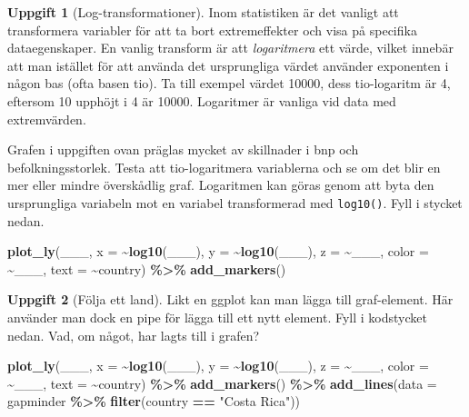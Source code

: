 \documentclass[
]{book}
\newenvironment{Shaded}{\begin{snugshade}}{\end{snugshade}}
\newcommand{\AttributeTok}[1]{\textcolor[rgb]{0.13,0.29,0.53}{#1}}
\newcommand{\FunctionTok}[1]{\textcolor[rgb]{0.13,0.29,0.53}{\textbf{#1}}}
\newcommand{\NormalTok}[1]{#1}
\newcommand{\SpecialCharTok}[1]{\textcolor[rgb]{0.81,0.36,0.00}{\textbf{#1}}}
\newcommand{\StringTok}[1]{\textcolor[rgb]{0.31,0.60,0.02}{#1}}
\theoremstyle{definition}
\theoremstyle{definition}
\theoremstyle{definition}
\newtheorem{exercise}{Uppgift}[chapter]
\theoremstyle{definition}
\theoremstyle{remark}
\begin{document}
\begin{exercise}[Log-transformationer]

Inom statistiken är det vanligt att transformera variabler för att ta bort extremeffekter och visa på specifika dataegenskaper. En vanlig transform är att \emph{logaritmera} ett värde, vilket innebär att man istället för att använda det ursprungliga värdet använder exponenten i någon bas (ofta basen tio). Ta till exempel värdet 10000, dess tio-logaritm är 4, eftersom 10 upphöjt i 4 är 10000. Logaritmer är vanliga vid data med extremvärden.

Grafen i uppgiften ovan präglas mycket av skillnader i bnp och befolkningsstorlek. Testa att tio-logaritmera variablerna och se om det blir en mer eller mindre överskådlig graf. Logaritmen kan göras genom att byta den ursprungliga variabeln mot en variabel transformerad med \texttt{log10()}. Fyll i stycket nedan.

\begin{Shaded}
\begin{Highlighting}[]
\FunctionTok{plot\_ly}\NormalTok{(\_\_\_, }\AttributeTok{x =} \SpecialCharTok{\textasciitilde{}}\FunctionTok{log10}\NormalTok{(\_\_\_), }\AttributeTok{y =} \SpecialCharTok{\textasciitilde{}}\FunctionTok{log10}\NormalTok{(\_\_\_), }\AttributeTok{z =} \SpecialCharTok{\textasciitilde{}}\NormalTok{\_\_\_, }\AttributeTok{color =} \SpecialCharTok{\textasciitilde{}}\NormalTok{\_\_\_, }\AttributeTok{text =} \SpecialCharTok{\textasciitilde{}}\NormalTok{country) }\SpecialCharTok{\%\textgreater{}\%} 
  \FunctionTok{add\_markers}\NormalTok{()}
\end{Highlighting}
\end{Shaded}

\end{exercise}

\begin{exercise}[Följa ett land]

Likt en ggplot kan man lägga till graf-element. Här använder man dock en pipe för lägga till ett nytt element. Fyll i kodstycket nedan. Vad, om något, har lagts till i grafen?

\begin{Shaded}
\begin{Highlighting}[]
\FunctionTok{plot\_ly}\NormalTok{(\_\_\_, }\AttributeTok{x =} \SpecialCharTok{\textasciitilde{}}\FunctionTok{log10}\NormalTok{(\_\_\_), }\AttributeTok{y =} \SpecialCharTok{\textasciitilde{}}\FunctionTok{log10}\NormalTok{(\_\_\_), }\AttributeTok{z =} \SpecialCharTok{\textasciitilde{}}\NormalTok{\_\_\_, }\AttributeTok{color =} \SpecialCharTok{\textasciitilde{}}\NormalTok{\_\_\_, }\AttributeTok{text =} \SpecialCharTok{\textasciitilde{}}\NormalTok{country) }\SpecialCharTok{\%\textgreater{}\%} 
  \FunctionTok{add\_markers}\NormalTok{() }\SpecialCharTok{\%\textgreater{}\%} 
  \FunctionTok{add\_lines}\NormalTok{(}\AttributeTok{data =}\NormalTok{ gapminder }\SpecialCharTok{\%\textgreater{}\%} \FunctionTok{filter}\NormalTok{(country }\SpecialCharTok{==} \StringTok{"Costa Rica"}\NormalTok{))}
\end{Highlighting}
\end{Shaded}

\end{exercise}
\end{document}
